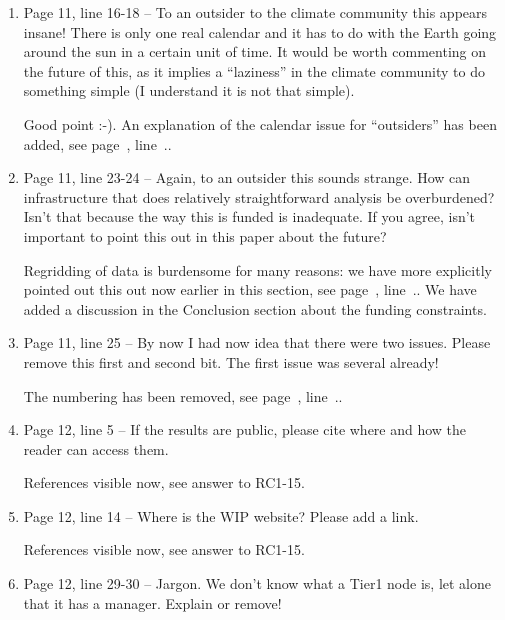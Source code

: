 \documentclass[gmd,manuscript]{copernicus}
\newcommand{\plref}[1]{see page~\pageref{p-#1}, line~\lineref{l-#1}.}
\newenvironment{answer}{\color{blue}}{}
\begin{document}
\begin{enumerate}[label=RC3-\arabic*,leftmargin=*]
  \begin{answer}
    References visible now, see answer to RC1-15.
  \end{answer}
\item Page 11, line 16-18 -- To an outsider to the climate community
  this appears insane! There is only one real calendar and it has to
  do with the Earth going around the sun in a certain unit of time. It
  would be worth commenting on the future of this, as it implies a
  “laziness” in the climate community to do something simple (I
  understand it is not that simple).

  \begin{answer}
    Good point :-). An explanation of the calendar issue for
    ``outsiders'' has been added, \plref{RC3-13}.
  \end{answer}
\item Page 11, line 23-24 -- Again, to an outsider this sounds strange.
  How can infrastructure that does relatively straightforward analysis
  be overburdened? Isn’t that because the way this is funded is
  inadequate. If you agree, isn’t important to point this out in this
  paper about the future?

  \begin{answer}
    Regridding of data is burdensome for many reasons: we have more
    explicitly pointed out this out now earlier in this section,
    \plref{RC3-14}. We have added a discussion in the Conclusion
    section about the funding constraints.
  \end{answer}
\item Page 11, line 25 -- By now I had now idea that there were two
  issues. Please remove this first and second bit. The first issue was
  several already!

  \begin{answer}
    The numbering has been removed, \plref{RC2-21}.
  \end{answer}
\item Page 12, line 5 -- If the results are public, please cite where
  and how the reader can access them.

  \begin{answer}
    References visible now, see answer to RC1-15.
  \end{answer}
\item Page 12, line 14 -- Where is the WIP website? Please add a link.

  \begin{answer}
    References visible now, see answer to RC1-15.
  \end{answer}
\item Page 12, line 29-30 -- Jargon. We don’t know what a Tier1 node
  is, let alone that it has a manager. Explain or remove!


\end{enumerate}
\end{document}
